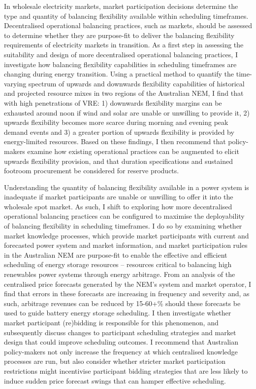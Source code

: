 \documentclass[12pt,a4paper,]{report}
\begin{document}
In wholesale electricity markets, market participation decisions
determine the type and quantity of balancing flexibility available
within scheduling timeframes. Decentralised operational balancing
practices, such as markets, should be assessed to determine whether they
are purpose-fit to deliver the balancing flexibility requirements of
electricity markets in transition. As a first step in assessing the
suitability and design of more decentralised operational balancing
practices, I investigate how balancing flexibility capabilities in
scheduling timeframes are changing during energy transition. Using a
practical method to quantify the time-varying spectrum of upwards and
downwards flexibility capabilities of historical and projected resource
mixes in two regions of the Australian NEM, I find that with high
penetrations of VRE: 1) downwards flexibility margins can be exhausted
around noon if wind and solar are unable or unwilling to provide it, 2)
upwards flexibility becomes more scarce during morning and evening peak
demand events and 3) a greater portion of upwards flexibility is
provided by energy-limited resources. Based on these findings, I then
recommend that policy-makers examine how existing operational practices
can be augmented to elicit upwards flexibility provision, and that
duration specifications and sustained footroom procurement be considered
for reserve products.

Understanding the quantity of balancing flexibility available in a power
system is inadequate if market participants are unable or unwilling to
offer it into the wholesale spot market. As such, I shift to exploring
how more decentralised operational balancing practices can be configured
to maximise the deployability of balancing flexibility in scheduling
timeframes. I do so by examining whether market knowledge processes,
which provide market participants with current and forecasted power
system and market information, and market participation rules in the
Australian NEM are purpose-fit to enable the effective and efficient
scheduling of energy storage resources -- resources critical to
balancing high renewables power systems through energy arbitrage. From
an analysis of the centralised price forecasts generated by the NEM's
system and market operator, I find that errors in these forecasts are
increasing in frequency and severity and, as such, arbitrage revenues
can be reduced by 15-60+\% should these forecasts be used to guide
battery energy storage scheduling. I then investigate whether market
participant (re)bidding is responsible for this phenomenon, and
subsequently discuss changes to participant scheduling strategies and
market design that could improve scheduling outcomes. I recommend that
Australian policy-makers not only increase the frequency at which
centralised knowledge processes are run, but also consider whether
stricter market participation restrictions might incentivise participant
bidding strategies that are less likely to induce sudden price forecast
swings that can hamper effective scheduling.
\end{document}

